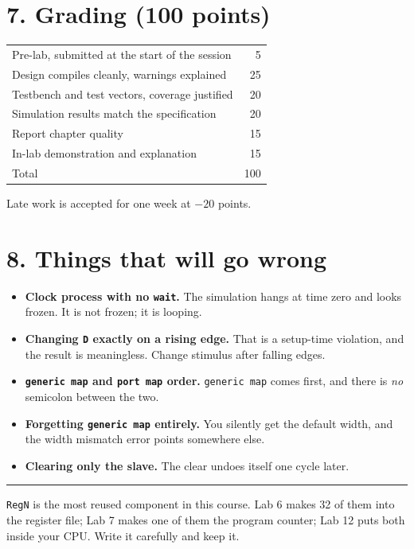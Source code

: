 \documentclass[11pt]{article}
\newcommand{\code}[1]{\texttt{#1}}
\newcommand{\hr}{\vspace{2pt}\hrule\vspace{6pt}}
\begin{document}
\section*{7. Grading (100 points)}

\begin{center}
\begin{tabular}{lr}
\toprule
Pre-lab, submitted at the start of the session & 5 \\
Design compiles cleanly, warnings explained & 25 \\
Testbench and test vectors, coverage justified & 20 \\
Simulation results match the specification & 20 \\
Report chapter quality & 15 \\
In-lab demonstration and explanation & 15 \\
\midrule
Total & 100 \\
\bottomrule
\end{tabular}
\end{center}

Late work is accepted for one week at $-20$ points.

\section*{8. Things that will go wrong}

\begin{itemize}[leftmargin=1.6em,itemsep=1pt]
\item \textbf{Clock process with no \code{wait}.} The simulation hangs at time
zero and looks frozen. It is not frozen; it is looping.
\item \textbf{Changing \code{D} exactly on a rising edge.} That is a setup-time
violation, and the result is meaningless. Change stimulus after falling edges.
\item \textbf{\code{generic map} and \code{port map} order.} \code{generic map}
comes first, and there is \emph{no} semicolon between the two.
\item \textbf{Forgetting \code{generic map} entirely.} You silently get the
default width, and the width mismatch error points somewhere else.
\item \textbf{Clearing only the slave.} The clear undoes itself one cycle later.
\end{itemize}

\vspace{10pt}
\hr
{\small \code{RegN} is the most reused component in this course. Lab 6 makes 32 of
them into the register file; Lab 7 makes one of them the program counter; Lab 12
puts both inside your CPU. Write it carefully and keep it.}
\end{document}
